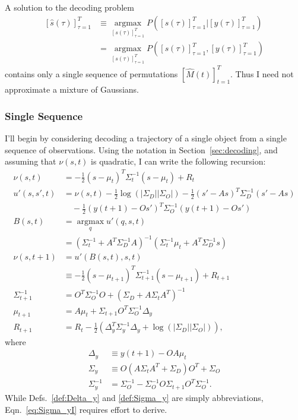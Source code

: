 \documentclass[12pt]{article}
\newcommand{\os}[4]{{\left[ #1(#2) \right]}_{#3}^{#4}} %
\newcommand{\ti}[2]{{#1}{(#2)}}                         %
\newcommand{\ts}[4]{\os{#1}{#2}{#2=#3}{#4}} %
\newcommand{\argmax}{\operatorname*{argmax}}
\newcommand{\logdet}{\log\left(\left|\Sigma_D\right| \left| \Sigma_O
    \right| \right)}
\begin{document}
A solution to the decoding problem
\begin{align*}
  \ts{\hat s}{\tau}{1}{T} &\equiv \argmax_{\ts{s}{\tau}{1}{T}}
  P(\ts{s}{\tau}{1}{T}|\ts{y}{\tau}{1}{T}) \\
            &=  \argmax_{\ts{s}{\tau}{1}{T}} P(\ts{s}{\tau}{1}{T},\ts{y}{\tau}{1}{T})
\end{align*}
contains only a single sequence of permutations $\ts{\hat
  M}{t}{1}{T}$.  Thus I need not approximate a mixture of Gaussians.

\subsubsection{Single Sequence}
\label{sec:single-sequence}

I'll begin by considering decoding a trajectory of a single object
from a single sequence of observations.  Using the notation in
Section~\ref{sec:decoding}, and assuming that $\nu(s,t)$ is quadratic,
I can write the following recursion:
\begin{align}
  \nu(s,t) &= -\frac{1}{2}(s-\mu_{t})^T
    \Sigma_{t}^{-1}(s-\mu_{t}) + R_t \nonumber \\
  \label{eq:decode_u'}
  u'(s,s',t) &= \nu(s,t) -\frac{1}{2} \logdet  - 
  \frac{1}{2}(s'-As)^T \Sigma_{D}^{-1} (s'-As)  \nonumber \\
  &\quad - \frac{1}{2}(\ti{y}{t+1} - O s')^T \Sigma_{O}^{-1}(\ti{y}{t+1}
    - O s') \\
  B(s,t) &= \argmax_{q} u'(q,s,t) \nonumber \\
  \label{eq:decode_B}
  &= \left( \Sigma_t^{-1} + A^T \Sigma_D^{-1} A \right)^{-1} \left(
    \Sigma_t^{-1} \mu_t + A^T \Sigma_D^{-1} s \right) \\
  \nu(s,t+1) &= u'(B(s,t),s,t) \nonumber \\
  &\equiv  -\frac{1}{2}(s-\mu_{t+1})^T
  \Sigma_{t+1}^{-1}(s-\mu_{t+1}) + R_{t+1} \nonumber \\
  \label{eq:new_Sigma}
  \Sigma_{t+1}^{-1} & = O^T\Sigma_O^{-1} O + \left( \Sigma_D + A \Sigma_t
    A^T \right)^{-1} \\
  \label{eq:new_mu}
  \mu_{t+1} &= A \mu_t + \Sigma_{t+1} O^T \Sigma_O^{-1} \Delta_y \\
  \label{eq:new_R}
  R_{t+1} &= R_t -\frac{1}{2} \left( \Delta_y^T \Sigma_y^{-1} \Delta_y
    + \logdet \right),
\end{align}
where
\begin{align}
  \label{def:Delta_y}
  \Delta_y &\equiv \ti{y}{t+1} - OA \mu_t \\
  \label{def:Sigma_y}
  \Sigma_y &\equiv O(A\Sigma_t A^T + \Sigma_D)O^T + \Sigma_O \\
  \label{eq:Sigma_yI}
  \Sigma_y^{-1} &= \Sigma_O^{-1} - \Sigma_O^{-1} O \Sigma_{t+1} O^T
  \Sigma_O^{-1}.
\end{align}
While Defs.~\eqref{def:Delta_y} and  \eqref{def:Sigma_y} are simply
abbreviations, Eqn.~\eqref{eq:Sigma_yI} requires effort to derive.
\end{document}
